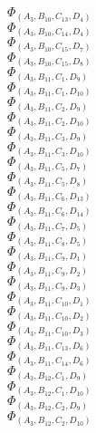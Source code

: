 \documentclass[14pt]{article}
\begin{document}
    $\Phi_{({A}_{3}, {B}_{10}, {C}_{13}, {D}_{4})}$ \\ 
    $\Phi_{({A}_{3}, {B}_{10}, {C}_{14}, {D}_{4})}$ \\ 
    $\Phi_{({A}_{3}, {B}_{10}, {C}_{15}, {D}_{7})}$ \\ 
    $\Phi_{({A}_{3}, {B}_{10}, {C}_{15}, {D}_{8})}$ \\ 
    $\Phi_{({A}_{3}, {B}_{11}, {C}_{1}, {D}_{9})}$ \\ 
    $\Phi_{({A}_{3}, {B}_{11}, {C}_{1}, {D}_{10})}$ \\ 
    $\Phi_{({A}_{3}, {B}_{11}, {C}_{2}, {D}_{9})}$ \\ 
    $\Phi_{({A}_{3}, {B}_{11}, {C}_{2}, {D}_{10})}$ \\ 
    $\Phi_{({A}_{3}, {B}_{11}, {C}_{3}, {D}_{9})}$ \\ 
    $\Phi_{({A}_{3}, {B}_{11}, {C}_{3}, {D}_{10})}$ \\ 
    $\Phi_{({A}_{3}, {B}_{11}, {C}_{5}, {D}_{7})}$ \\ 
    $\Phi_{({A}_{3}, {B}_{11}, {C}_{5}, {D}_{8})}$ \\ 
    $\Phi_{({A}_{3}, {B}_{11}, {C}_{6}, {D}_{13})}$ \\ 
    $\Phi_{({A}_{3}, {B}_{11}, {C}_{6}, {D}_{14})}$ \\ 
    $\Phi_{({A}_{3}, {B}_{11}, {C}_{7}, {D}_{5})}$ \\ 
    $\Phi_{({A}_{3}, {B}_{11}, {C}_{8}, {D}_{5})}$ \\ 
    $\Phi_{({A}_{3}, {B}_{11}, {C}_{9}, {D}_{1})}$ \\ 
    $\Phi_{({A}_{3}, {B}_{11}, {C}_{9}, {D}_{2})}$ \\ 
    $\Phi_{({A}_{3}, {B}_{11}, {C}_{9}, {D}_{3})}$ \\ 
    $\Phi_{({A}_{3}, {B}_{11}, {C}_{10}, {D}_{1})}$ \\ 
    $\Phi_{({A}_{3}, {B}_{11}, {C}_{10}, {D}_{2})}$ \\ 
    $\Phi_{({A}_{3}, {B}_{11}, {C}_{10}, {D}_{3})}$ \\ 
    $\Phi_{({A}_{3}, {B}_{11}, {C}_{13}, {D}_{6})}$ \\ 
    $\Phi_{({A}_{3}, {B}_{11}, {C}_{14}, {D}_{6})}$ \\ 
    $\Phi_{({A}_{3}, {B}_{12}, {C}_{1}, {D}_{9})}$ \\ 
    $\Phi_{({A}_{3}, {B}_{12}, {C}_{1}, {D}_{10})}$ \\ 
    $\Phi_{({A}_{3}, {B}_{12}, {C}_{2}, {D}_{9})}$ \\ 
    $\Phi_{({A}_{3}, {B}_{12}, {C}_{2}, {D}_{10})}$ \\ 
\end{document}
